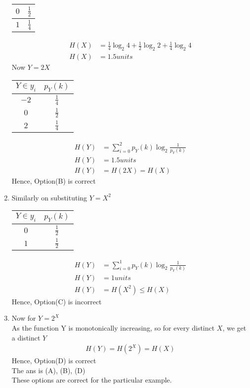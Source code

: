 \documentclass[journal,12pt,onecolumn]{IEEEtran}
\theoremstyle{remark}
\begin{document}
\begin{enumerate}
\begin{table}[htpb]
\begin{tabular}{|c|c|}
\hline
$0$                         & $\frac{1}{2}$  \\
\hline
$1$                         & $\frac{1}{4} $ \\
\hline
\end{tabular}
\end{table}
\begin{align}
H(X) &= \frac{1}{4}\log _{2}4 + \frac{1}{2}\log _{2}2 +\frac{1}{4}\log _{2}4\\
H(X) &=  1.5 units
 \end{align}
 Now $ Y = 2X$
 \begin{table}[htpb]
\centering 
\begin{tabular}{|c|c|}
\hline
$Y \in y_i$	&          $p_Y(k)$\\
\hline
$-2$                         & $\frac{1}{4} $       \\
\hline
$0$                         & $\frac{1}{2} $ \\
\hline
$2$                         & $\frac{1}{4}$ \\
\hline
\end{tabular}
\end{table}
\begin{align}
H(Y) &= \sum_{i=0}^{2}p_Y(k) \log _{2} \frac{1}{p_Y(k)}\\
H(Y) &=  1.5 units\\
  H(Y) &= H(2X) =H(X)
 \end{align}
 Hence, Option(B) is correct\\
 \item Similarly on substituting $Y = X^2$\\
  \begin{table}[htpb]
\centering 
\begin{tabular}{|c|c|}
\hline
$Y \in y_i$	&	$p_Y(k)$\\
\hline
$0$                         & $\frac{1}{2} $       \\
\hline
$1$                         & $\frac{1}{2} $ \\
\hline
\end{tabular}
\end{table}
 \begin{align}
H(Y) &= \sum_{i=0}^{1}p_Y(k) \log _{2} \frac{1}{p_Y(k)}\\
H(Y) &=  1units\\
  H(Y) &= H(X^2) \leq H(X)
 \end{align}
 Hence, Option(C) is incorrect\\
 \item Now for $Y = 2^X$\\
 As the function Y is monotonically increasing, so for every distinct $X$, we get a distinct $Y$ 
 \begin{align}
  H(Y) = H(2^X) =  H(X) 
 \end{align}
 Hence, Option(D) is correct\\
 The ans is (A), (B), (D)\\
 These options are correct for the particular example.
 \end{enumerate}
\end{document}

